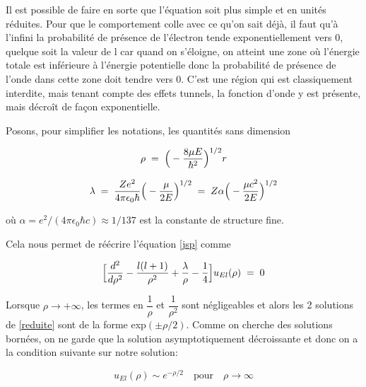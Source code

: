 \vspace{0.2cm}

Il est possible de faire en sorte que l'équation soit plus simple et en unités réduites. Pour que le comportement colle avec ce qu'on sait déjà, il faut qu'à l'infini la probabilité de présence de l'électron tende exponentiellement vers 0, quelque soit la valeur de l car quand on s'éloigne, on atteint une zone où l'énergie totale est inférieure à l'énergie potentielle donc la probabilité de présence de l'onde dans cette zone doit tendre vers 0. C'est une région qui est classiquement interdite, mais tenant compte des effets tunnels, la fonction d'onde y est présente, mais décroît de façon exponentielle. \\

\vspace{0.2cm}

Posons, pour simplifier les notations, les quantités sans dimension 

\begin{equation*}
    \rho\; = \;\Big(-\dfrac{8\mu E}{\hbar^2}\Big)^{1/2}r
\end{equation*}

\begin{equation}
    \lambda\; = \;\dfrac{Ze^2}{4\pi\epsilon_0 \hbar}\Big(-\dfrac{\mu}{2E}\Big)^{1/2}\; = \; Z\alpha\Big(-\dfrac{\mu c^2}{2E}\Big)^{1/2}
    \label{lambda}
\end{equation}

où $\alpha=e^2/(4\pi\epsilon_0 \hbar c) \approx 1/137$ est la constante de structure fine. 

Cela nous permet de réécrire l'équation \eqref{jsp} comme

\begin{equation}
    \Big[\dfrac{d^2}{d\rho^2}-\dfrac{l(l+1)}{\rho^2}+\dfrac{\lambda}{\rho}-\dfrac{1}{4}\Big]u_{El}(\rho)\; = \;0
    \label{reduite}
\end{equation}

\vspace{0.2cm}

Lorsque $\rho \rightarrow +\infty$, les termes en $\dfrac{1}{\rho}$ et $\dfrac{1}{\rho^2}$ sont négligeables et alors les 2 solutions de \eqref{reduite} sont de la forme exp$(\pm \rho/2)$. Comme on cherche des solutions bornées, on ne garde que la solution asymptotiquement décroissante et donc on a la condition suivante sur notre solution: 

\begin{equation*}
    u_{El}(\rho)\sim e^{-\rho/2} \quad \text{pour} \quad \rho \longrightarrow \infty
\end{equation*}

